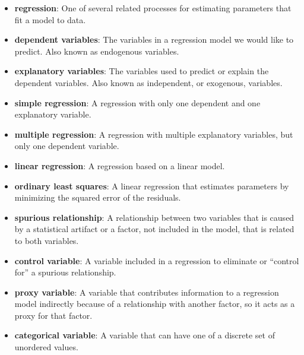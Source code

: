 \documentclass[12pt]{book}
\begin{document}
\begin{itemize}

\item {\bf regression}: One of several related processes for estimating parameters
that fit a model to data.

\item {\bf dependent variables}: The variables in a regression model we would
like to predict.  Also known as endogenous variables.

\item {\bf explanatory variables}: The variables used to predict or explain
the dependent variables.  Also known as independent, or exogenous,
variables.

\item {\bf simple regression}: A regression with only one dependent and
one explanatory variable.

\item {\bf multiple regression}: A regression with multiple explanatory
variables, but only one dependent variable.

\item {\bf linear regression}: A regression based on a linear model.

\item {\bf ordinary least squares}: A linear regression that estimates
parameters by minimizing the squared error of the residuals.

\item {\bf spurious relationship}: A relationship between two variables that is 
caused by a statistical artifact or a factor, not included in the
model, that is related to both variables.

\item {\bf control variable}: A variable included in a regression to
eliminate or ``control for'' a spurious relationship.

\item {\bf proxy variable}: A variable that contributes information to
a regression model indirectly because of a relationship with another
factor, so it acts as a proxy for that factor.

\item {\bf categorical variable}: A variable that can have one of a
discrete set of unordered values.


\end{itemize}
\end{document}
